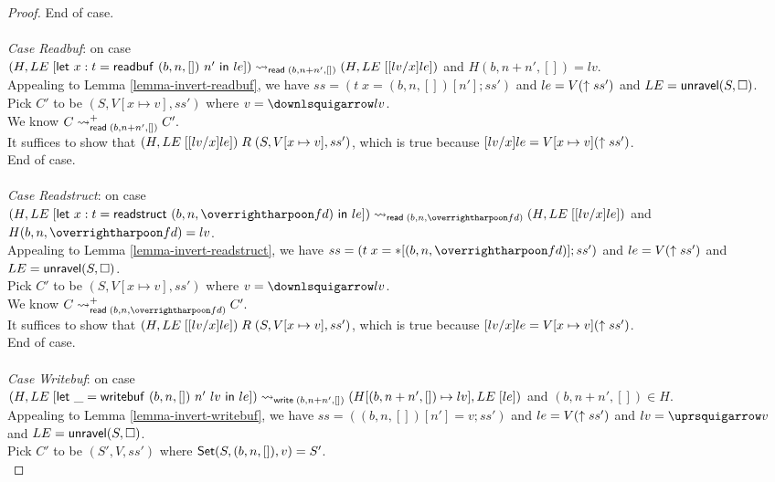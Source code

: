 \begin{proof}
  End of case. \\
  \\
  \emph{Case Readbuf}: on case \\
  $(H, \fplug{LE}{\elet{x:t}{\ereadbuf{(b,n,[])}{n'}}{le}})\step_{\symread\;(b,n+n',[])}(H, \fplug{LE}{\subst{x}{lv}{le}})$ and $H(b,n+n',[])=lv$. \\
  Appealing to Lemma \ref{lemma-invert-readbuf}, we have $ss=(t\;x=(b,n,[])[n'];ss')$ and $le=V(\ctolow{ss'})$ and $LE=\unravel(S, \symhole)$. \\
  Pick $C'$ to be $(S, V[x\mapsto v], ss')$ where $v=\lowtoce{lv}$. \\
  We know $C\step^+_{\symread\;(b,n+n',[])}C'.$ \\
  It suffices to show that $(H, \fplug{LE}{\subst{x}{lv}{le}})\;R\;(S, V[x\mapsto v], ss')$, which is true because $\subst{x}{lv}{le}=V[x\mapsto v](\ctolow{ss'})$. \\
  End of case. \\
  \\
  \emph{Case Readstruct}: on case \\
  $(H, \fplug{LE}{\elet{x:t}{\ereadstruct{(b,n,\ls{fd})}}{le}})\step_{\symread\;(b,n,\ls{fd})}(H, \fplug{LE}{\subst{x}{lv}{le}})$ and $H(b,n,\ls{fd})=lv$. \\
  Appealing to Lemma \ref{lemma-invert-readstruct}, we have $ss=(t\;x=\eread{(b,n,\ls{fd})};ss')$ and $le=V(\ctolow{ss'})$ and $LE=\unravel(S, \symhole)$. \\
  Pick $C'$ to be $(S, V[x\mapsto v], ss')$ where $v=\lowtoce{lv}$. \\
  We know $C\step^+_{\symread\;(b,n,\ls{fd})}C'.$ \\
  It suffices to show that $(H, \fplug{LE}{\subst{x}{lv}{le}})\;R\;(S, V[x\mapsto v], ss')$, which is true because $\subst{x}{lv}{le}=V[x\mapsto v](\ctolow{ss'})$. \\
  End of case. \\
  \\
  \emph{Case Writebuf}: on case \\
  $(H, \fplug{LE}{\elet{\_}{\ewritebuf{(b,n,[])}{n'}{lv}}{le}})\step_{\symwrite\;(b,n+n',[])}(H[(b,n+n',[])\mapsto lv], \fplug{LE}{le})$ and $(b,n+n',[])\in H$. \\
  Appealing to Lemma \ref{lemma-invert-writebuf}, we have $ss=((b,n,[])[n']=v;ss')$ and $le=V(\ctolow{ss'})$ and $lv=\ctolowe{v}$ and $LE=\unravel(S, \symhole)$. \\
  Pick $C'$ to be $(S', V, ss')$ where $\symset(S, (b,n,[]), v) = S'$. \\

\end{proof}
